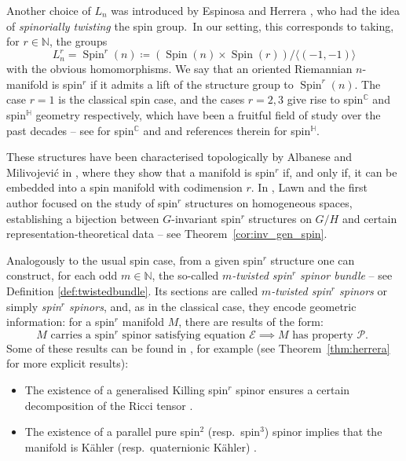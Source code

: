 \documentclass[pdftex]{sigma}
\numberwithin{equation}{section}
\newcommand{\N}{\mathbb{N}} %
\newcommand{\C}{\mathbb{C}} %
\DeclareMathOperator{\Spin}{Spin}
\begin{document}
		Another choice of $L_n$ was introduced by Espinosa and Herrera \cite{EH16}, who had the idea of \textit{spinorially twisting} the spin group.\ In our setting, this corresponds to taking, for $r \in \N$, the groups
		\[ L_n^r = \Spin^r(n) \coloneqq ( \Spin(n) \times \Spin(r) )/\langle (-1 , -1) \rangle \]
		with the obvious homomorphisms. We say that an oriented Riemannian $n$-manifold is spin$^r$ if it admits a lift of the structure group to $\Spin^r(n)$. The case $r=1$ is the classical spin case, and the cases $r=2, 3$ give rise to spin$^{\C}$ and spin$^{\mathbb{H}}$ geometry respectively, which have been a fruitful field of study over the past decades -- see \cite{Friedrich_book, moroianu_spinc} for spin$^{\C}$ and \cite{herrera_spinq,lawson} and references therein for spin$^{\mathbb{H}}$.
		
		These structures have been characterised topologically by Albanese and Milivojevi\'{c} in \cite{AM21}, where they show that a manifold is spin$^r$ if, and only if, it can be embedded into a spin manifold with codimension $r$. In \cite{gen_spin_AL}, Lawn and the first author focused on the study of spin$^r$ structures on homogeneous spaces, establishing a bijection between $G$-invariant spin$^r$ structures on $G/H$ and certain representation-theoretical data -- see Theorem~\ref{cor:inv_gen_spin}.
		
		Analogously to the usual spin case, from a given spin$^r$ structure one can construct, for each odd $m \in \N$, the so-called \textit{$m$-twisted spin$^r$ spinor bundle} -- see Definition \ref{def:twistedbundle}. Its sections are called \textit{$m$-twisted spin$^r$ spinors} or simply \textit{spin$^r$ spinors}, and, as in the classical case, they encode geometric information: for a spin$^r$ manifold $M$, there are results of the form:
		\begin{equation*}
			\text{$M$ carries a spin$^r$ spinor satisfying equation $\mathscr{E}$} \implies \text{$M$ has property $\mathscr{P}$. }
		\end{equation*}
		Some of these results can be found in \cite{EH16,ES19}, for example (see Theorem~\ref{thm:herrera} for more explicit results):
		\begin{itemize}\itemsep=0pt
			\item The existence of a generalised Killing spin$^r$ spinor ensures a certain decomposition of the Ricci tensor \cite[Theorem~3.3]{EH16}.
			\item The existence of a parallel pure spin$^2$ \big(resp.\ spin$^3$\big) spinor implies that the manifold is K\"{a}hler (resp.\ quaternionic K\"{a}hler) \cite[Corollaries~4.10 and 4.12]{ES19}.
		\end{itemize}
		
\end{document}
